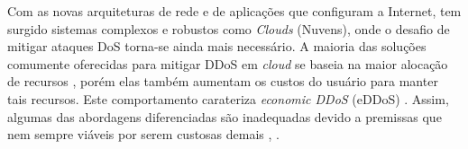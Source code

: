 Com as novas arquiteturas de rede e de aplicações que configuram a Internet, tem surgido sistemas complexos e robustos como \emph{Clouds} (Nuvens), onde o desafio de mitigar ataques DoS torna-se ainda mais necessário. A maioria das soluções comumente oferecidas para mitigar DDoS em \emph{cloud} se baseia na maior alocação de recursos \cite{Peng:2007:SND:1216370.1216373}, porém elas também aumentam os custos do usuário para manter tais recursos. Este comportamento carateriza \emph{economic DDoS} (eDDoS) \cite{Soon:10}.  
%
Assim, algumas das abordagens diferenciadas são inadequadas devido a premissas que nem sempre viáveis %
por serem custosas demais \cite{Bakshi:10}, \cite{Liu:2010:NFD:1866835.1866849}. 

